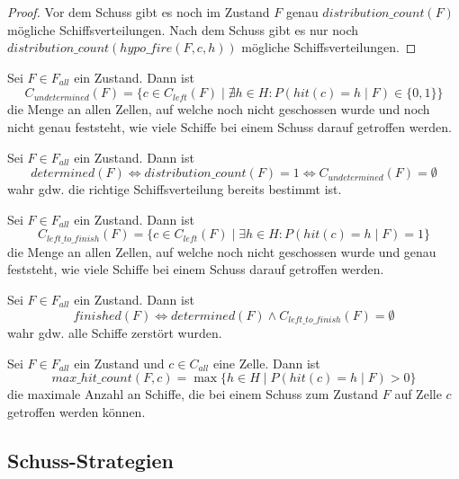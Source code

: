\documentclass[a4paper,12pt]{llncs}
\numberwithin{equation}{section}
\begin{document}
\begin{proof}
Vor dem Schuss gibt es noch im Zustand $F$ genau $distribution\_count(F)$ mögliche Schiffsverteilungen.
Nach dem Schuss gibt es nur noch \\$distribution\_count(hypo\_fire(F,c, h))$ mögliche Schiffsverteilungen.
\end{proof}


\begin{definition}
Sei $F\in F_{all}$ ein Zustand.
Dann ist
\[
C_{undetermined}(F)=\{ c \in C_{left}(F) \mid \nexists h \in H \colon P(hit(c)=h \mid F) \in \{0, 1\}\}
\]
die Menge an allen Zellen, auf welche noch nicht geschossen wurde und noch nicht genau feststeht, wie viele Schiffe bei einem Schuss darauf getroffen werden.
\end{definition}

\begin{definition}
Sei $F\in F_{all}$ ein Zustand.
Dann ist
\[
determined(F) \Leftrightarrow distribution\_count(F)=1 \Leftrightarrow C_{undetermined}(F) = \emptyset
\]
wahr gdw. die richtige Schiffsverteilung bereits bestimmt ist.
\end{definition}


\begin{definition}
Sei $F\in F_{all}$ ein Zustand.
Dann ist
\[
C_{left\_to\_finish}(F)=\{ c \in C_{left}(F) \mid \exists h \in H \colon P(hit(c)=h \mid F) = 1\}
\]
die Menge an allen Zellen, auf welche noch nicht geschossen wurde und genau feststeht, wie viele Schiffe bei einem Schuss darauf getroffen werden.
\end{definition}

\begin{definition}
Sei $F\in F_{all}$ ein Zustand.
Dann ist
\[
finished(F) \Leftrightarrow determined(F) \land C_{left\_to\_finish}(F) = \emptyset
\]
wahr gdw. alle Schiffe zerstört wurden.
\end{definition}

\begin{definition}
Sei $F\in F_{all}$ ein Zustand und $c \in C_{all}$ eine Zelle.
Dann ist
\[
max\_hit\_count(F, c)=\max \{h \in H \mid P(hit(c) = h \mid F) > 0\}
\]
die maximale Anzahl an Schiffe, die bei einem Schuss zum Zustand $F$ auf Zelle $c$ getroffen werden können.
\end{definition}

\subsection{Schuss-Strategien}
\end{document}

